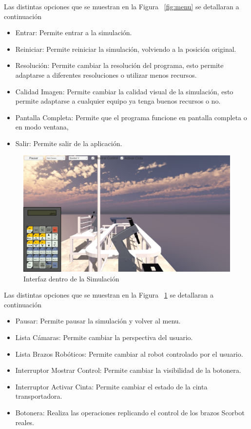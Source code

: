 Las distintas opciones que se muestran en la Figura ~\ref{fig:menu} se detallaran a continuación
\begin{itemize}
\item Entrar: Permite entrar a la simulación.
\item Reiniciar: Permite reiniciar la simulación, volviendo a la posición original.
\item Resolución: Permite cambiar la resolución del programa, esto permite adaptarse a diferentes resoluciones o utilizar menos recursos.
\item Calidad Imagen: Permite cambiar la calidad visual de la simulación, esto permite adaptarse a cualquier equipo ya tenga buenos recursos o no.
\item Pantalla Completa: Permite que el programa funcione en pantalla completa o en modo ventana,
\item Salir: Permite salir de la aplicación.
\end{itemize}

\clearpage
\begin{figure}[ht]
\centering
\includegraphics[width=16cm]{figures/simulacion.png}
\caption{Interfaz dentro de la Simulación}
\label{fig:interfaz}
\end{figure}


Las distintas opciones que se muestran en la Figura ~\ref{fig:interfaz} se detallaran a continuación
\begin{itemize}
\item Pausar: Permite pausar la simulación y volver al menu.
\item Lista Cámaras: Permite cambiar la perspectiva del usuario.
\item Lista Brazos Robóticos: Permite cambiar al robot controlado por el usuario.
\item Interruptor Mostrar Control: Permite cambiar la visibilidad de la botonera.
\item Interruptor Activar Cinta: Permite cambiar el estado de la cinta transportadora.
\item Botonera: Realiza las operaciones replicando el control de los brazos Scorbot reales.
\end{itemize}